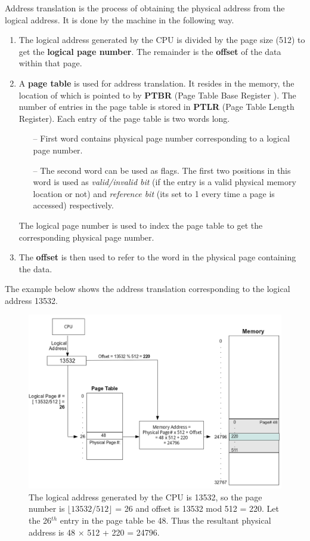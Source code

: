 \documentclass[11pt]{report}
\begin{document}
Address translation is the process of obtaining the physical address from the logical address. It is done by the machine in the following way. 
\begin{enumerate}
\item The logical address generated by the CPU is divided by the page size (512) to get the \textbf{logical page number}. The remainder is the \textbf{offset} of the data within that page.


\item A \textbf{page table} is used for address translation. It resides in the memory, the location of which is pointed to by \textbf{PTBR} (Page Table Base Register
). The number of entries in the page table is stored in \textbf{PTLR} (Page Table Length Register). Each entry of the page table is two words long.
\begin{itemize}
 \item[--] First word contains physical page number corresponding to a logical page number.
 \item[--] The second word can be used as flags. The first two positions in this word is used as \textit{valid/invalid bit} (if the entry is a valid physical memory location or not) and \textit{reference bit} (its set to 1 every time a page is accessed) respectively.
 	
\end{itemize}
The logical page number is used to index the page table to get the corresponding physical page number.

\item The \textbf{offset} is then used to refer to the word in the physical page containing the data.
\end{enumerate} 
\vspace{0.3in}

The example below shows the address translation corresponding to the logical address  13532.
\begin{figure}[ht]
	\centering
	\includegraphics[scale=0.35]{address_translation.png}
	\caption{ \small The logical address generated by the CPU is 13532, so the page number is $\lfloor 13532/512 \rfloor$ = 26 and offset is 13532 mod 512 = 220. Let the 26$^{th}$ entry in the page table be 48. Thus the resultant physical address is 48 $\times$ 512 + 220 = 24796.}
	\label{fig:paging}
\end{figure}
\end{document}
